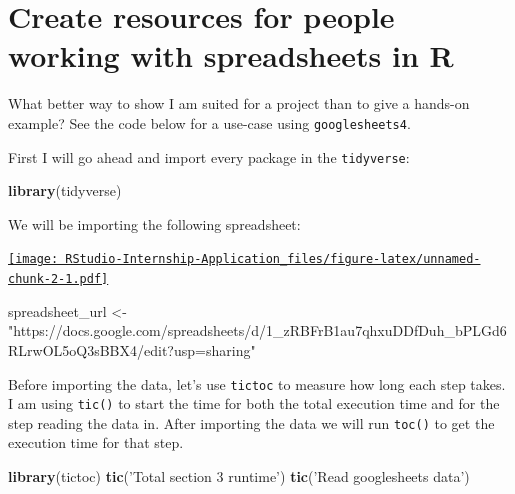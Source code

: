 \documentclass[
]{book}
\newenvironment{Shaded}{\begin{snugshade}}{\end{snugshade}}
\newcommand{\KeywordTok}[1]{\textcolor[rgb]{0.13,0.29,0.53}{\textbf{#1}}}
\newcommand{\NormalTok}[1]{#1}
\newcommand{\StringTok}[1]{\textcolor[rgb]{0.31,0.60,0.02}{#1}}
\begin{document}
\hypertarget{create-resources-for-people-working-with-spreadsheets-in-r}{%
\section{Create resources for people working with spreadsheets in R}\label{create-resources-for-people-working-with-spreadsheets-in-r}}

What better way to show I am suited for a project than to give a hands-on example? See the code below for a use-case using \texttt{googlesheets4}\citep{R-googlesheets4}.

First I will go ahead and import every package in the \texttt{tidyverse}\citep{R-tidyverse}:

\begin{Shaded}
\begin{Highlighting}[]
\KeywordTok{library}\NormalTok{(tidyverse)}
\end{Highlighting}
\end{Shaded}

We will be importing the following spreadsheet:

\href{https://docs.google.com/spreadsheets/d/1_zRBFrB1au7qhxuDDfDuh_bPLGd6RLrwOL5oQ3sBBX4/edit\#gid=395468559}{\texttt{[image: RStudio-Internship-Application\_files/figure-latex/unnamed-chunk-2-1.pdf]}}

\begin{Shaded}
\begin{Highlighting}[]
\NormalTok{spreadsheet_url <-}\StringTok{ "https://docs.google.com/spreadsheets/d/1_zRBFrB1au7qhxuDDfDuh_bPLGd6RLrwOL5oQ3sBBX4/edit?usp=sharing"}
\end{Highlighting}
\end{Shaded}

Before importing the data, let's use \texttt{tictoc} \citep{R-tictoc} to measure how long each step takes. I am using \texttt{tic()} to start the time for both the total execution time and for the step reading the data in. After importing the data we will run \texttt{toc()} to get the execution time for that step.

\begin{Shaded}
\begin{Highlighting}[]
\KeywordTok{library}\NormalTok{(tictoc)}
\KeywordTok{tic}\NormalTok{(}\StringTok{'Total section 3 runtime'}\NormalTok{)}
\KeywordTok{tic}\NormalTok{(}\StringTok{'Read googlesheets data'}\NormalTok{)}
\end{Highlighting}
\end{Shaded}
\end{document}
